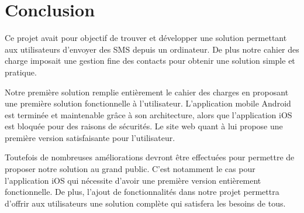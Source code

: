 \cleardoublepage



\chapter*{Conclusion}



Ce projet avait pour objectif de trouver et développer une solution permettant aux utilisateurs d'envoyer des SMS depuis un ordinateur.
De plus notre cahier des charge imposait une gestion fine des contacts pour obtenir une solution simple et pratique.

Notre première solution remplie entièrement le cahier des charges en proposant une première solution fonctionnelle à l'utilisateur.
L'application mobile Android est terminée et maintenable grâce à son architecture, alors que l'application iOS est bloquée pour des raisons de sécurités.
Le site web quant à lui propose une première version satisfaisante pour l'utilisateur.

Toutefois de nombreuses améliorations devront être effectuées pour permettre de proposer notre solution au grand public.
C'est notamment le cas pour l'application iOS qui nécessite d'avoir une première version entièrement fonctionnelle.
De plus, l'ajout de fonctionnalités dans notre projet permettra d'offrir aux utilisateurs une solution complète qui satisfera les besoins de tous.
